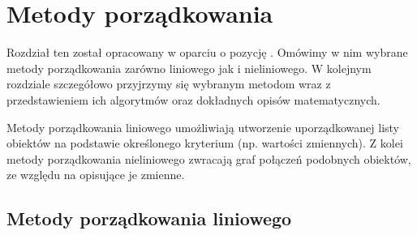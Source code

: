 \documentclass[12pt,a4paper]{report}
\newtheorem{definition}[theorem]{Definicja}
\newtheorem{example}{Przykład}
\begin{document}
%


\chapter{Metody porządkowania}\label{metody porzadkowania}
Rozdział ten został opracowany w oparciu o pozycję \cite[Rozdział 2]{panek2013}. Omówimy w nim wybrane metody porządkowania zarówno liniowego jak i nieliniowego. W kolejnym rozdziale szczegółowo przyjrzymy się wybranym metodom wraz z przedstawieniem ich algorytmów oraz dokładnych opisów matematycznych. 

Metody porządkowania liniowego umożliwiają utworzenie uporządkowanej listy obiektów na podstawie określonego kryterium (np. wartości zmiennych). 
Z kolei metody porządkowania nieliniowego zwracają graf połączeń podobnych obiektów, ze względu na opisujące je zmienne. 

\section{Metody porządkowania liniowego}
\end{document}
